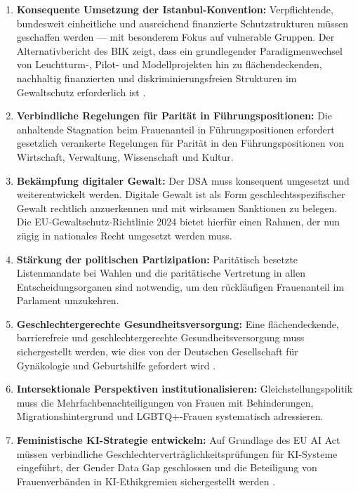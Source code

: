 \documentclass[12pt,a4paper]{article}
\begin{document}
	\begin{enumerate}[label=\arabic*.]
		\item \textbf{Konsequente Umsetzung der Istanbul-Konvention:} Verpflichtende, bundesweit einheitliche und ausreichend finanzierte Schutzstrukturen müssen geschaffen werden — mit besonderem Fokus auf vulnerable Gruppen. Der Alternativbericht des BIK zeigt, dass ein grundlegender Paradigmenwechsel von Leuchtturm-, Pilot- und Modellprojekten hin zu flächendeckenden, nachhaltig finanzierten und diskriminierungsfreien Strukturen im Gewaltschutz erforderlich ist \cite{bik_alternativbericht}.
		
		\item \textbf{Verbindliche Regelungen für Parität in Führungspositionen:} Die anhaltende Stagnation beim Frauenanteil in Führungspositionen erfordert gesetzlich verankerte Regelungen für Parität in den Führungspositionen von Wirtschaft, Verwaltung, Wissenschaft und Kultur.
		
		\item \textbf{Bekämpfung digitaler Gewalt:} Der DSA muss konsequent umgesetzt und weiterentwickelt werden. Digitale Gewalt ist als Form geschlechtsspezifischer Gewalt rechtlich anzuerkennen und mit wirksamen Sanktionen zu belegen. Die EU-Gewaltschutz-Richtlinie 2024 bietet hierfür einen Rahmen, der nun zügig in nationales Recht umgesetzt werden muss.
		
		\item \textbf{Stärkung der politischen Partizipation:} Paritätisch besetzte Listenmandate bei Wahlen und die paritätische Vertretung in allen Entscheidungsorganen sind notwendig, um den rückläufigen Frauenanteil im Parlament umzukehren.
		
		\item \textbf{Geschlechtergerechte Gesundheitsversorgung:} Eine flächendeckende, barrierefreie und geschlechtergerechte Gesundheitsversorgung muss sichergestellt werden, wie dies von der Deutschen Gesellschaft für Gynäkologie und Geburtshilfe gefordert wird \cite{dggg_appell}.
		
		\item \textbf{Intersektionale Perspektiven institutionalisieren:} Gleichstellungspolitik muss die Mehrfachbenachteiligungen von Frauen mit Behinderungen, Migrationshintergrund und LGBTQ+-Frauen systematisch adressieren.
		
		\item \textbf{Feministische KI-Strategie entwickeln:} Auf Grundlage des EU AI Act müssen verbindliche Geschlechterverträglichkeitsprüfungen für KI-Systeme eingeführt, der Gender Data Gap geschlossen und die Beteiligung von Frauenverbänden in KI-Ethikgremien sichergestellt werden \cite{eu_ai_act_frauenrat}.
		

\end{enumerate}
\end{document}

